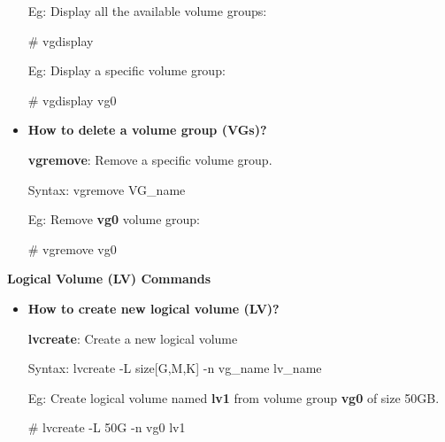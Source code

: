 \begin{flushleft}
\begin{itemize}
		Eg: Display all the available volume groups:
		\begin{tcolorbox}[breakable,notitle,boxrule=-0pt,colback=black,colframe=black]
			\color{green}
			\font=9pt
			\# vgdisplay
			\font=4pt
		\end{tcolorbox}
		Eg: Display a specific volume group:
		\begin{tcolorbox}[breakable,notitle,boxrule=-0pt,colback=black,colframe=black]
			\color{green}
			\font=9pt
			\# vgdisplay vg0
			\font=4pt
		\end{tcolorbox}
		
		\bigskip
		\bigskip
		\item  \textbf{How to delete a volume group (VGs)?}
		
		\textbf{vgremove}: Remove a specific volume group.
		\begin{tcolorbox}[breakable,notitle,boxrule=-0pt,colback=pink,colframe=pink]
			\color{black}
			\font=9pt
			Syntax: vgremove VG\_name
			\font=4pt
		\end{tcolorbox}
		
		Eg: Remove \textbf{vg0} volume group:
		\begin{tcolorbox}[breakable,notitle,boxrule=-0pt,colback=black,colframe=black]
			\color{green}
			\font=9pt
			\# vgremove vg0
			\font=4pt
		\end{tcolorbox}
		
	\end{itemize}
	
	\newpage
	
	\textbf{Logical Volume (LV) Commands}
	
	\begin{itemize}
		\item \textbf{How to create new logical volume (LV)?}
		
		\textbf{lvcreate}: Create a new logical volume
		\begin{tcolorbox}[breakable,notitle,boxrule=-0pt,colback=pink,colframe=pink]
			\color{black}
			\font=9pt
			Syntax: lvcreate -L size[G,M,K] -n vg\_name  lv\_name
			\font=4pt
		\end{tcolorbox}
		
		
		
		\bigskip
		
		Eg: Create logical volume named \textbf{lv1} from volume group \textbf{vg0} of size 50GB.
		\bigskip
		\begin{tcolorbox}[breakable,notitle,boxrule=-0pt,colback=black,colframe=black]
			\color{green}
			\font=9pt
			\# lvcreate -L 50G -n vg0 lv1
			\font=4pt
		\end{tcolorbox}
				

\end{itemize}
\end{flushleft}
